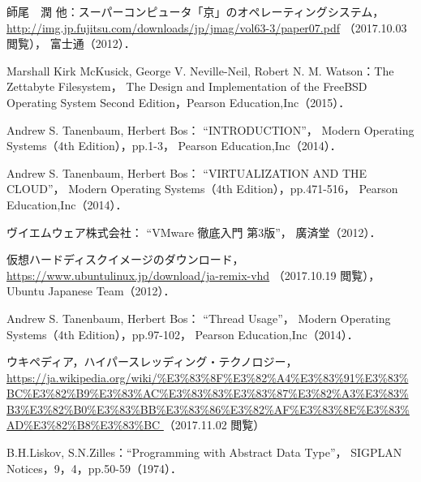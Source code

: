 \begin{thebibliography}{9}
師尾　潤 他：スーパーコンピュータ「京」のオペレーティングシステム，
\url{http://img.jp.fujitsu.com/downloads/jp/jmag/vol63-3/paper07.pdf}
（2017.10.03 閲覧），
富士通（2012）．

Marshall Kirk McKusick,
George V. Neville-Neil,
Robert N. M. Watson：The Zettabyte Filesystem，
The Design and Implementation of the FreeBSD Operating System
Second Edition，Pearson Education,Inc（2015）．


Andrew S. Tanenbaum, Herbert Bos：
``INTRODUCTION''，
Modern Operating Systems（4th Edition），pp.1-3，
Pearson Education,Inc（2014）．

Andrew S. Tanenbaum, Herbert Bos：
``VIRTUALIZATION AND THE CLOUD''，
Modern Operating Systems（4th Edition），pp.471-516，
Pearson Education,Inc（2014）．

ヴイエムウェア株式会社：
``VMware 徹底入門 第3版''，
廣済堂（2012）．

仮想ハードディスクイメージのダウンロード，
\url{https://www.ubuntulinux.jp/download/ja-remix-vhd}
（2017.10.19 閲覧），
Ubuntu Japanese Team（2012）．

Andrew S. Tanenbaum, Herbert Bos：
``Thread Usage''，
Modern Operating Systems（4th Edition），pp.97-102，
Pearson Education,Inc（2014）．

ウキペディア，ハイパースレッディング・テクノロジー，
\url{
https://ja.wikipedia.org/wiki/%
}（2017.11.02 閲覧）

B.H.Liskov, S.N.Zilles：``Programming with Abstract Data Type''，
SIGPLAN Notices，9，4，pp.50-59（1974）．
\end{thebibliography}
